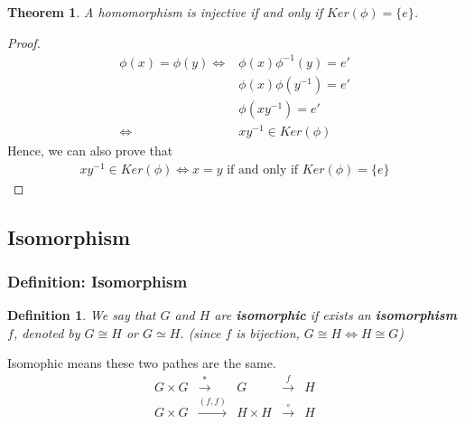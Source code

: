 \documentclass[11pt,a4paper]{article}
\newtheorem{theorem}{Theorem}
\newtheorem{definition}{Definition}
\begin{document}
\begin{theorem}
    A homomorphism is injective if and only if $Ker(\phi)=\{e\}$.
\end{theorem}
\begin{proof}
        \begin{equation}
            \begin{aligned}
                \phi(x)=\phi(y) \Leftrightarrow	&\phi(x)\phi^{-1}(y)=e'\\
                &\phi(x)\phi(y^{-1})=e'\\
                &\phi(xy^{-1})=e'\\
                \Leftrightarrow	&xy^{-1}\in Ker(\phi)
            \end{aligned}
            \nonumber
        \end{equation}
        Hence, we can also prove that
        \begin{equation}
            \begin{aligned}
                xy^{-1}\in Ker(\phi)\Leftrightarrow x=y\text{ if and only if }Ker(\phi)=\{e\}
            \end{aligned}
            \nonumber
        \end{equation}
\end{proof}




\subsection{Isomorphism}
\subsubsection{Definition: Isomorphism}
\begin{definition}
    We say that $G$ and $H$ are \textbf{isomorphic} if exists an \textbf{isomorphism} $f$, denoted by $G\cong H$ or $G\simeq H$. (since $f$ is bijection, $G\cong H\Leftrightarrow H\cong G$)
\end{definition}


Isomophic means these two pathes are the same.
\begin{equation}
    \begin{aligned}
        G\times G& \stackrel{*}{\longrightarrow} & G &\stackrel{f}{\longrightarrow}& H\\
        G\times G& \stackrel{(f,f)}{\longrightarrow} &H\times H & \stackrel{\circ}{\longrightarrow}& H\\
    \end{aligned}
    \nonumber
\end{equation}
\end{document}
